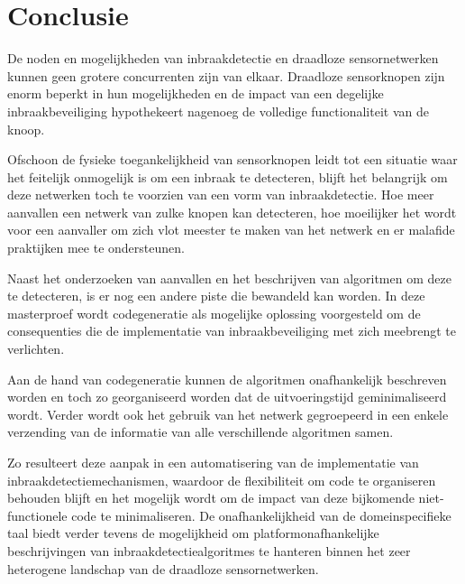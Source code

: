 \documentclass[12pt,a4paper]{article}
\begin{document}
\section*{Conclusie}

De noden en mogelijkheden van inbraakdetectie en draadloze sensornetwerken
kunnen geen grotere concurrenten zijn van elkaar. Draadloze sensorknopen zijn
enorm beperkt in hun mogelijkheden en de impact van een degelijke
inbraakbeveiliging hypothekeert nagenoeg de volledige functionaliteit van de
knoop.

Ofschoon de fysieke toegankelijkheid van sensorknopen leidt tot een situatie
waar het feitelijk onmogelijk is om een inbraak te detecteren, blijft het
belangrijk om deze netwerken toch te voorzien van een vorm van inbraakdetectie.
Hoe meer aanvallen een netwerk van zulke knopen kan detecteren, hoe moeilijker
het wordt voor een aanvaller om zich vlot meester te maken van het netwerk en
er malafide praktijken mee te ondersteunen.

Naast het onderzoeken van aanvallen en het beschrijven van algoritmen om deze
te detecteren, is er nog een andere piste die bewandeld kan worden. In deze
masterproef wordt codegeneratie als mogelijke oplossing voorgesteld om de
consequenties die de implementatie van inbraakbeveiliging met zich meebrengt te
verlichten.

Aan de hand van codegeneratie kunnen de algoritmen onafhankelijk beschreven
worden en toch zo georganiseerd worden dat de uitvoeringstijd geminimaliseerd
wordt. Verder wordt ook het gebruik van het netwerk gegroepeerd in een enkele
verzending van de informatie van alle verschillende algoritmen samen.

Zo resulteert deze aanpak in een automatisering van de implementatie van
inbraakdetectiemechanismen, waardoor de flexibiliteit om code te organiseren
behouden blijft en het mogelijk wordt om de impact van deze bijkomende
niet-functionele code te minimaliseren. De onafhankelijkheid van de
domeinspecifieke taal biedt verder tevens de mogelijkheid om
platformonafhankelijke beschrijvingen van inbraakdetectiealgoritmes te
hanteren binnen het zeer heterogene landschap van de draadloze sensornetwerken.
\end{document}
